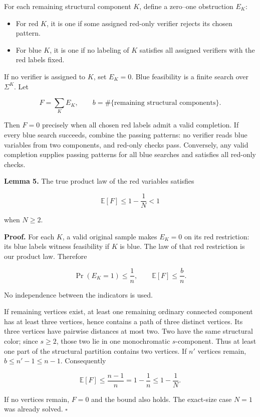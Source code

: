 \documentclass[11pt,a4paper]{article}
\providecommand{\tightlist}{\setlength{\itemsep}{0pt}\setlength{\parskip}{0pt}}
\begin{document}
For each remaining structural component \(K\), define a zero--one obstruction \(E_K\):

\begin{itemize}
\tightlist
\item For red \(K\), it is one if some assigned red-only verifier rejects its chosen pattern.
\item For blue \(K\), it is one if no labeling of \(K\) satisfies all assigned verifiers with the red labels fixed.
\end{itemize}

If no verifier is assigned to \(K\), set \(E_K=0\).
Blue feasibility is a finite search over \(\Sigma^K\).
Let

\[ F=\sum_KE_K,\qquad b=\#\{\text{remaining structural components}\}. \]

Then \(F=0\) precisely when all chosen red labels admit a valid completion.
If every blue search succeeds, combine the passing patterns: no verifier reads blue variables from two components, and red-only checks pass.
Conversely, any valid completion supplies passing patterns for all blue searches and satisfies all red-only checks.

\textbf{Lemma 5.} The true product law of the red variables satisfies

\[ \mathbb E[F]\le1-\frac1N<1 \]

when \(N\ge2\).

\textbf{Proof.} For each \(K\), a valid original sample makes \(E_K=0\) on its red restriction: its blue labels witness feasibility if \(K\) is blue.
The law of that red restriction is our product law.
Therefore

\[ \Pr(E_K=1)\le\frac1n, \qquad \mathbb E[F]\le\frac bn. \]

No independence between the indicators is used.

If remaining vertices exist, at least one remaining ordinary connected component has at least three vertices, hence contains a path of three distinct vertices.
Its three vertices have pairwise distances at most two.
Two have the same structural color; since \(s\ge2\), those two lie in one monochromatic \(s\)-component.
Thus at least one part of the structural partition contains two vertices.
If \(n'\) vertices remain, \(b\le n'-1\le n-1\).
Consequently

\[ \mathbb E[F]\le\frac{n-1}{n}=1-\frac1n\le1-\frac1N. \]

If no vertices remain, \(F=0\) and the bound also holds.
The exact-size case \(N=1\) was already solved. \(\square\)
\end{document}
